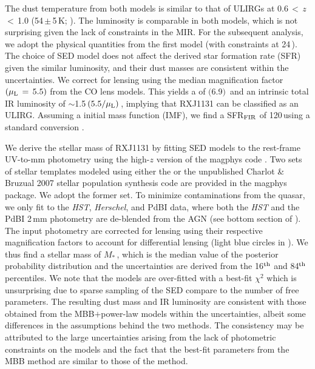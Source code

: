 \documentclass[]{emulateapj}
\begin{document}
The dust temperature from both models is similar to that of
ULIRGs at 0.6\,$<$\,$z$\,$<$\,1.0 (54\,$\pm$\,5\,K;
\citealt[hereafter C13]{Combes13a}).
The \fir luminosity is comparable in both models, which is
not surprising given the lack of constraints in the MIR.
For the subsequent analysis, we adopt the physical quantities
from the first model (\ie with constraints at 24\,\micron).
The choice of SED model does not affect
the derived star formation rate (SFR) given the similar \fir luminosity,
and their dust masses are consistent within the uncertainties.
We correct for lensing using the median magnification
factor $(\mu_{\rm L}\,=\,5.5)$
from the CO lens models. This yields a
\LFIR of $($6.9$)$\,\Lsun
and
an intrinsic total IR luminosity of $\sim$1.5\,$(5.5/\mu_{\rm L})$\,\Lsun, implying that RXJ1131 can be classified as an ULIRG.
Assuming a \citet{Salpeter55a} initial
mass function (IMF), we find a
SFR$_{\rm FIR}$ of 120\,\sfrU using a
standard conversion \citep{Kennicutt98a}.

We derive the stellar mass of RXJ1131 by
fitting SED models to the rest-frame UV-to-mm photometry
using the high-$z$ version of the {\sc magphys} code \citep{Magphys08a,Magphys15a}.
Two sets of stellar templates  modeled using either the \citet{BC03a} or the unpublished
Charlot \& Bruzual 2007 stellar population synthesis code
are provided in the {\sc magphys} package.
We adopt the former set.
To minimize contaminations from the quasar, we only fit to the {\it HST}, {\it Herschel}, and PdBI data,
where both the {\it HST} and the PdBI 2\,mm photometry are de-blended from the AGN
(see bottom section of ).
The input photometry are corrected for lensing using their respective magnification factors
to account for differential lensing (light blue circles in ).
We thus find a stellar mass of $M_*$\,\Msun, which
is the median value of the posterior probability distribution and
the uncertainties are derived from the 16$^{\rm th}$ and 84$^{\rm th}$ percentiles.
We note that the models are over-fitted with a best-fit $\chi^2$
which is unsurprising due to sparse sampling of the SED
compare to the number of free parameters.
The resulting dust mass and IR luminosity are consistent with those obtained
from the MBB$+$power-law models within the uncertainties, albeit some differences
in the assumptions behind the two methods.
The consistency may be attributed to the large uncertainties arising from the lack of photometric constraints on the models and the fact that the best-fit parameters from the MBB method are similar to those of the  method.
\end{document}
